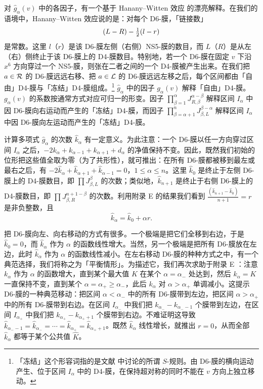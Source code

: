 对 $\hat g_{\alpha}(v)$ 中的各因子，有一个基于 Hanany–Witten 效应 \cite{Hanany:1996ie} 的漂亮解释。在我们的语境中，Hanany–Witten 效应说的是：对每个 D6-膜，「链接数」
\begin{equation}\label{eq:ch05-linking}
(L-R) - \tfrac{1}{2} (l -r )
\end{equation}
是常数。这里 $l$（$r$）是该 D6-膜左侧（右侧）NS5-膜的数目，而 $L$（$R$）是从左（右）侧终止于该 D6-膜上的 D4-膜数目。特别地，若一个 D6-膜在固定 $v$ 下沿 $x^6$ 方向穿过一个 NS5-膜，则张在二者之间的一个 D4-膜被产生出来。在我们把 $a\in \mathcal{R}$ 的 D6-膜远远右移、把 $a\in \mathcal{L}$ 的 D6-膜远远左移之后，每个区间都由「自由」D4-膜与「冻结」D4-膜组成。\footnote{「冻结」这个形容词指的是文献 \cite{Hanany:1996ie} 中讨论的所谓 $S$-规则。由 D6-膜的横向运动产生、位于区间 $I_\alpha$ 中的 D4-膜，在保持超对称的同时不能在 $v$ 方向上独立移动。} $\hat g_\alpha$ 中的因子 $g_{\alpha}(v)$ 解释「自由」D4-膜。$g_{\alpha}(v)$ 的系数按通常方式对应可归一的形变。因子 $\prod_{\beta=1}^{\alpha} J_{R,\beta}^{\alpha-\beta}$ 解释区间 $I_\alpha$ 中因 D6-膜向右运动而产生的「冻结」D4-膜，而因子 $\prod_{\beta=\alpha+1}^{n} J_{\beta,L}^{\beta-\alpha}$ 解释区间 $I_\alpha$ 中因 D6-膜向左运动而产生的「冻结」D4-膜。

计算多项式 $\hat g_{\alpha}$ 的次数 $\hat k_\alpha$ 有一定意义。为此注意：一个 D6-膜以任一方向穿过区间 $I_\alpha$ 之后，$-2k_\alpha + k_{\alpha -1} + k_{\alpha +1} + d_\alpha$ 的净值保持不变。因此，既然我们初始的位形把这些值全取为零（为了共形性），就可推出：在所有 D6-膜都被移到最左或最右之后，有 $-2\hat k_\alpha + \hat k_{\alpha+1} + \hat k_{\alpha-1}=0$，$1\leq \alpha \leq n$。这里 $\hat k_0$ 是终止于左侧 D6-膜上的 D4-膜数目，即 $\prod J_{\beta,L}^\beta$ 的次数；类似地，$\hat k_{n+1}$ 是终止于右侧 D6-膜上的 D4-膜数目，即 $\prod J_{\beta,R}^{n+1-\beta}$ 的次数。利用附录 E%
的结果我们看到 $\frac{(\hat k_{n+1}  - \hat k_0 )}{n+1}=r$ 是非负整数，且
\begin{equation}\label{eq:solvekhat}
\hat k_\alpha = \hat k_0 + \alpha r.
\end{equation}

把 D6-膜向左、向右移动的方式有很多。一个极端是把它们全移到右边，于是 $\hat k_{0}=0$，而 $\hat k_\alpha$ 作为 $\alpha$ 的函数线性增大。当然，另一个极端是把所有 D6-膜放在左边，此时 $\hat k_\alpha$ 作为 $\alpha$ 的函数线性减小。在左右移动 D6-膜的种种方式之中，有一个典范选择，我们将称之为「平衡情形」。为描述它，我们再次求助于附录 E%
：注意 $k_\alpha$ 作为 $\alpha$ 的函数增大，直到某个最大值 $K$ 在某个 $\alpha=\alpha_{-}$ 处达到，然后 $k_\alpha=K$ 一直保持不变，直到某个 $\alpha=\alpha_+\geq \alpha_-$，此后 $k_\alpha$ 对 $\alpha > \alpha_+$ 单调减小。这提示 D6-膜的一种典范移动：把区间 $\alpha < \alpha_-$ 中的所有 D6-膜带到左边，把区间 $\alpha > \alpha_+$ 中的所有 D6-膜带到右边。在区间 $I_{\alpha_-}$ 中我们把 $k_{\alpha_-}-k_{\alpha_--1}$ 个膜带到左边，在区间 $I_{\alpha_+}$ 中我们把 $k_{\alpha_+}-k_{\alpha_++1}$ 个膜带到右边。不难证明这导致 $\hat k_{\alpha_--1} = \hat k_{\alpha_-} = \cdots = \hat k_{\alpha_+} = \hat k_{\alpha_++1}$。既然 $\hat k_\alpha$ 线性增长，就推出 $r=0$，从而全部 $\hat k_\alpha$ 都等于某个公共值 $\hat K$。

